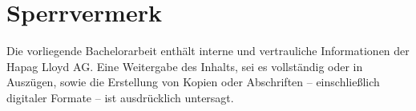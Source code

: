 \chapter*{Sperrvermerk}
Die vorliegende Bachelorarbeit enthält interne und vertrauliche Informationen der Hapag Lloyd AG. Eine Weitergabe des Inhalts, sei es vollständig oder in Auszügen, sowie die Erstellung von Kopien oder Abschriften – einschließlich digitaler Formate – ist ausdrücklich untersagt.